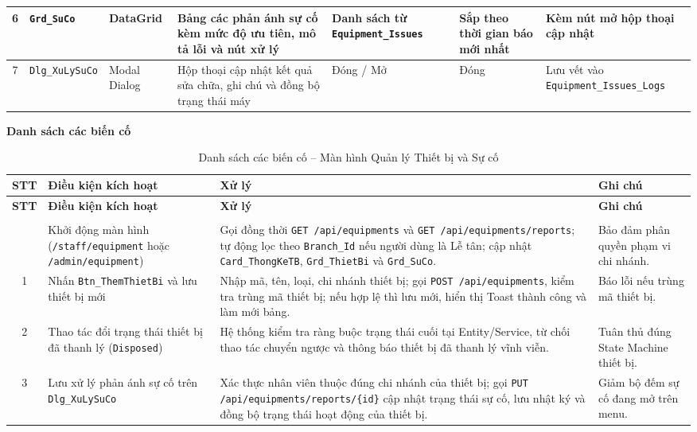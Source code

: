 \documentclass[a4paper,12pt]{article}
\begin{document}
{\begin{longtable}{|c|L{2.95cm}|L{1.85cm}|L{2.95cm}|L{2.75cm}|L{1.90cm}|L{2.05cm}|}
6 & \texttt{Grd\_SuCo} & DataGrid & Bảng các phản ánh sự cố kèm mức độ ưu tiên, mô tả lỗi và nút xử lý & Danh sách từ \texttt{Equipment\_\hspace{0pt}Issues} & Sắp theo thời gian báo mới nhất & Kèm nút mở hộp thoại cập nhật \\*  & \texttt{Dlg\_\hspace{0pt}XuLySuCo} & Modal Dialog & Hộp thoại cập nhật kết quả sửa chữa, ghi chú và đồng bộ trạng thái máy & Đóng / Mở & Đóng & Lưu vết vào \texttt{Equipment\_\hspace{0pt}Issues\_\hspace{0pt}Logs} \\ \hline
\end{longtable}
}

\par\medskip\noindent\textbf{Danh sách các biến cố}\par\smallskip
{\footnotesize
\setlength{\tabcolsep}{4pt}
\begin{longtable}{|c|L{3.5cm}|L{7.8cm}|L{3.5cm}|}
\hline
\textbf{STT} & \textbf{Điều kiện kích hoạt} & \textbf{Xử lý} & \textbf{Ghi chú} \\
\hline
\endfirsthead
\hline
\textbf{STT} & \textbf{Điều kiện kích hoạt} & \textbf{Xử lý} & \textbf{Ghi chú} \\
\hline
\endhead
\hline
\endfoot
\hline
\caption{Danh sách các biến cố -- Màn hình Quản lý Thiết bị và Sự cố} \\
 & Khởi động màn hình (\texttt{/staff/equipment} hoặc \texttt{/admin/equipment}) & Gọi đồng thời \texttt{GET /api/equipments} và \texttt{GET /api/equipments/reports}; tự động lọc theo \texttt{Branch\_Id} nếu người dùng là Lễ tân; cập nhật \texttt{Card\_ThongKeTB}, \texttt{Grd\_ThietBi} và \texttt{Grd\_SuCo}. & Bảo đảm phân quyền phạm vi chi nhánh. \\  & Nhấn \texttt{Btn\_ThemThietBi} và lưu thiết bị mới & Nhập mã, tên, loại, chi nhánh thiết bị; gọi \texttt{POST /api/equipments}, kiểm tra trùng mã thiết bị; nếu hợp lệ thì lưu mới, hiển thị Toast thành công và làm mới bảng. & Báo lỗi nếu trùng mã thiết bị. \\  & Thao tác đổi trạng thái thiết bị đã thanh lý (\texttt{Disposed}) & Hệ thống kiểm tra ràng buộc trạng thái cuối tại Entity/Service, từ chối thao tác chuyển ngược và thông báo thiết bị đã thanh lý vĩnh viễn. & Tuân thủ đúng State Machine thiết bị. \\*  & Lưu xử lý phản ánh sự cố trên \texttt{Dlg\_XuLySuCo} & Xác thực nhân viên thuộc đúng chi nhánh của thiết bị; gọi \texttt{PUT /api/equipments/reports/\{id\}} cập nhật trạng thái sự cố, lưu nhật ký và đồng bộ trạng thái hoạt động của thiết bị. & Giảm bộ đếm sự cố đang mở trên menu. \\ \hline
\end{longtable}
}
\end{document}
